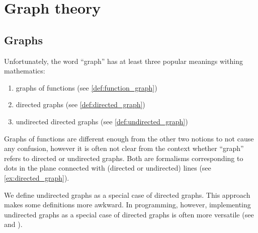 \section{Graph theory}\label{sec:graph_theory}
\subsection{Graphs}\label{subsec:graphs}

\begin{remark}\label{remark:directed_and_undirected_graphs}
  Unfortunately, the word \enquote{graph} has at least three popular meanings withing mathematics:
  \begin{enumerate}
    \item graphs of functions (see \cref{def:function_graph})
    \item directed graphs (see \cref{def:directed_graph})
    \item undirected directed graphs (see \cref{def:undirected_graph})
  \end{enumerate}

  Graphs of functions are different enough from the other two notions to not cause any confusion, however it is often not clear from the context whether \enquote{graph} refers to directed or undirected graphs. Both are formalisms corresponding to dots in the plane connected with (directed or undirected) lines (see \cref{ex:directed_graph}).

   We define undirected graphs as a special case of directed graphs. This approach makes some definitions more awkward. In programming, however, implementing undirected graphs as a special case of directed graphs is often more versatile (see \cite[section 5.4]{Erickson2019} and \cite[chapter 1, section 2.4]{Gondran1984}).
\end{remark}

